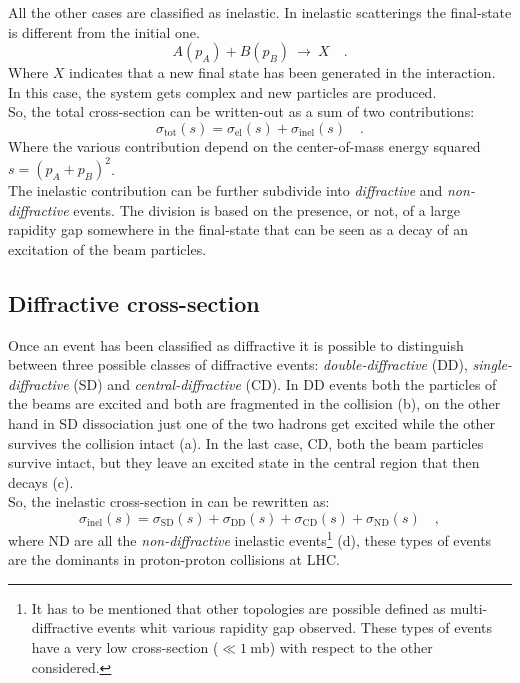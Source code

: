 \noindent All the other cases are classified as inelastic. In inelastic scatterings the final-state is different from the initial one.
\begin{equation}
	A(p_A)+B(p_B)\ \longrightarrow \ X\quad.
\end{equation} 
Where $X$ indicates that a new final state has been generated in the interaction. In this case, the system gets complex and new particles are produced. 
\\
So, the total cross-section can be written-out as a sum of two contributions:
\begin{equation}
	\sigma_{\text{tot}}(s) = \sigma_{\text{el}}(s) + \sigma_{\text{inel}}(s)\quad.
	\label{eq:cross_section_elastic_inelastic}
\end{equation}
Where the various contribution depend on the center-of-mass energy squared $s=(p_A+p_B)^2$.
\\
The inelastic contribution can be further subdivide into \textit{diffractive} and \textit{non-diffractive} events. The division is based on the presence, or not, of a large rapidity gap somewhere in the final-state that can be seen as a decay of an excitation of the beam particles.

\subsection{Diffractive cross-section} 

Once an event has been classified as diffractive it is possible to distinguish between three possible classes of diffractive events: \textit{double-diffractive} (DD), \textit{single-diffractive} (SD) and \textit{central-diffractive} (CD). 
In DD events both the particles of the beams are excited and both are fragmented in the collision (b), on the other hand in SD dissociation just one of the two hadrons get excited while the other survives the collision intact (a). In the last case, CD, both the beam particles survive intact, but they leave an excited state in the central region that then decays (c).
\\
So, the inelastic cross-section in  can be rewritten as:
\begin{equation}
	\sigma_{\text{inel}}(s) = \sigma_{\text{SD}}(s)+\sigma_{\text{DD}}(s)+\sigma_{\text{CD}}(s)+\sigma_{\text{ND}}(s)  \quad,
\end{equation}
where ND are all the \textit{non-diffractive} inelastic events\footnote{It has to be mentioned that other topologies are possible defined as multi-diffractive events whit various  rapidity gap observed. These types of events have a very low cross-section ($\ll 1 \ \mathrm{mb}$) with respect to the other considered.} (d), these types of events are the dominants in proton-proton collisions at LHC.

